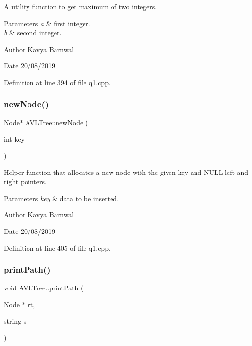 A utility function to get maximum of two integers. 
\begin{DoxyParams}{Parameters}
{\em a} & first integer. \\
\hline
{\em b} & second integer. \\
\hline
\end{DoxyParams}
\begin{DoxyAuthor}{Author}
Kavya Barnwal 
\end{DoxyAuthor}
\begin{DoxyDate}{Date}
20/08/2019 
\end{DoxyDate}


Definition at line 394 of file q1.\+cpp.

\mbox{\label{class_a_v_l_tree_a7d0da3880ea6b30f7df37547f99be642}} 
\subsubsection{\texorpdfstring{new\+Node()}{newNode()}}
{\footnotesize\ttfamily \hyperlink{class_node}{Node}$\ast$ A\+V\+L\+Tree\+::new\+Node (\begin{DoxyParamCaption}\item[{int}]{key }\end{DoxyParamCaption})\hspace{0.3cm}{\ttfamily [inline]}}

Helper function that allocates a new node with the given key and N\+U\+LL left and right pointers. 
\begin{DoxyParams}{Parameters}
{\em key} & data to be inserted. \\
\hline
\end{DoxyParams}
\begin{DoxyAuthor}{Author}
Kavya Barnwal 
\end{DoxyAuthor}
\begin{DoxyDate}{Date}
20/08/2019 
\end{DoxyDate}


Definition at line 405 of file q1.\+cpp.

\mbox{\label{class_a_v_l_tree_a6fe238e7e0e458de06ee3357f5044e3a}} 
\subsubsection{\texorpdfstring{print\+Path()}{printPath()}}
{\footnotesize\ttfamily void A\+V\+L\+Tree\+::print\+Path (\begin{DoxyParamCaption}\item[{\hyperlink{class_node}{Node} $\ast$}]{rt,  }\item[{string}]{s }\end{DoxyParamCaption})\hspace{0.3cm}{\ttfamily [inline]}}

